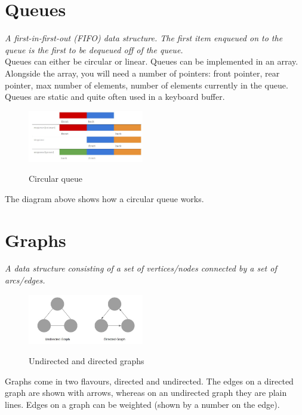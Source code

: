 \documentclass[a4paper,11pt, twocolumn]{article}
\begin{document}
\section{Queues}
\textit{A first-in-first-out (FIFO) data structure. The first item enqueued on to the queue is the first to be dequeued off of the queue.}\\
Queues can either be circular or linear. Queues can be implemented in an array. Alongside the array, you will need a number of pointers: front pointer, rear pointer, max number of elements, number of elements currently in the queue. Queues are static and quite often used in a keyboard buffer. 
\begin{figure}[H]
    \centering
    \includegraphics[width=0.45\textwidth]{queue.jpg}
    \label{fig:queue}
    \caption{Circular queue}
\end{figure}
\noindent The diagram above shows how a circular queue works. 

\section{Graphs}
\textit{A data structure consisting of a set of vertices/nodes connected by a set of arcs/edges.}\\
\begin{figure}[H]
    \centering
    \includegraphics[width=0.45\textwidth]{graphsDirUndir.jpg}
    \label{fig:graphsDirUndir}
    \caption{Undirected and directed graphs}
\end{figure}
\noindent Graphs come in two flavours, directed and undirected. The edges on a directed graph are shown with arrows, whereas on an undirected graph they are plain lines. Edges on a graph can be weighted (shown by a number on the edge). 
\end{document}
